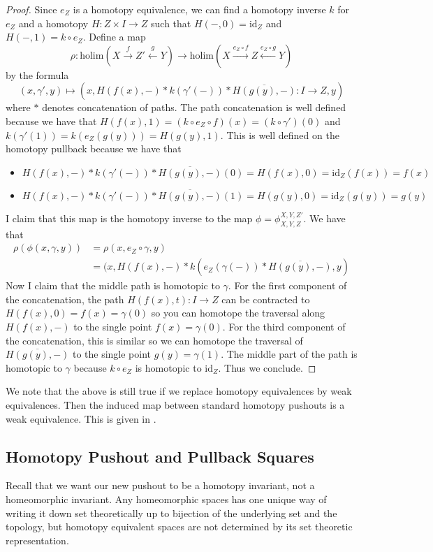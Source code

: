 \begin{prp}
\begin{proof}
Since $e_Z$ is a homotopy equivalence, we can find a homotopy inverse $k$ for $e_Z$ and a homotopy $H:Z\times I\to Z$ such that $H(-,0)=\text{id}_Z$ and $H(-,1)=k\circ e_Z$. Define a map $$\rho:\text{holim}(X\overset{f}{\rightarrow}Z'\overset{g}{\leftarrow}Y)\to\text{holim}(X\overset{e_Z\circ f}{\rightarrow}Z\overset{e_Z\circ g}{\leftarrow}Y)$$ by the formula $$(x,\gamma',y)\mapsto(x,H(f(x),-)\ast k(\gamma'(-))\ast\overline{H(g(y),-)}:I\to Z,y)$$ where $\ast$ denotes concatenation of paths. The path concatenation is well defined because we have that $H(f(x),1)=(k\circ e_Z\circ f)(x)=(k\circ\gamma')(0)$ and $k(\gamma'(1))=k(e_Z(g(y)))=H(g(y),1)$. This is well defined on the homotopy pullback because we have that 
\begin{itemize}
\item $H(f(x),-)\ast k(\gamma'(-))\ast\overline{H(g(y),-)}(0)=H(f(x),0)=\text{id}_Z(f(x))=f(x)$
\item $H(f(x),-)\ast k(\gamma'(-))\ast\overline{H(g(y),-)}(1)=H(g(y),0)=\text{id}_Z(g(y))=g(y)$
\end{itemize}
I claim that this map is the homotopy inverse to the map $\phi=\phi_{X,Y,Z}^{X,Y,Z'}$. We have that 
\begin{align*}
\rho(\phi(x,\gamma,y))&=\rho(x,e_Z\circ\gamma,y)\\
&=(x,H(f(x),-)\ast k(e_Z(\gamma(-))\ast\overline{H(g(y),-)},y)
\end{align*}
Now I claim that the middle path is homotopic to $\gamma$. For the first component of the concatenation, the path $H(f(x),t):I\to Z$ can be contracted to $H(f(x),0)=f(x)=\gamma(0)$ so you can homotope the traversal along $H(f(x),-)$ to the single point $f(x)=\gamma(0)$. For the third component of the concatenation, this is similar so we can homotope the traversal of $\overline{H(g(y),-)}$ to the single point $g(y)=\gamma(1)$. The middle part of the path is homotopic to $\gamma$ because $k\circ e_Z$ is homotopic to $\text{id}_Z$. Thus we conclude. 
\end{proof}
\end{prp}

We note that the above is still true if we replace homotopy equivalences by weak equivalences. Then the induced map between standard homotopy pushouts is a weak equivalence. This is given in \cite{CHT}. 

\subsection{Homotopy Pushout and Pullback Squares}
Recall that we want our new pushout to be a homotopy invariant, not a homeomorphic invariant. Any homeomorphic spaces has one unique way of writing it down set theoretically up to bijection of the underlying set and the topology, but homotopy equivalent spaces are not determined by its set theoretic representation. 

